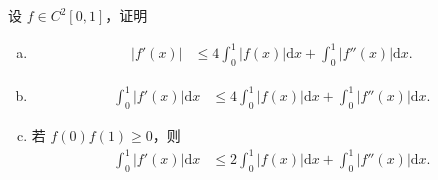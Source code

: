 \documentclass[../../main.tex]{subfiles}
\begin{document}
\begin{example}
设 \( f \in C^2[0,1] \)，证明
\begin{enumerate}[(a)]
\item 
\begin{align}
|f'(x)| &\leqslant 4\int_0^1 |f(x)| \mathrm{d}x + \int_0^1 |f''(x)| \mathrm{d}x. \label{eq::::::::::::::7151--------------5}
\end{align}

\item 
\begin{align}
\int_0^1 |f'(x)| \mathrm{d}x &\leqslant 4\int_0^1 |f(x)| \mathrm{d}x + \int_0^1 |f''(x)| \mathrm{d}x .\label{eq::::::::::::::7151--------------6}
\end{align}

\item  若 \( f(0)f(1) \geqslant 0 \)，则
\begin{align}
\int_0^1 |f'(x)| \mathrm{d}x &\leqslant 2\int_0^1 |f(x)| \mathrm{d}x + \int_0^1 |f''(x)| \mathrm{d}x. \label{eq::::::::::::::7151--------------7}
\end{align}
\end{enumerate}
\end{example}
\end{document}
